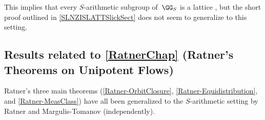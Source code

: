 % 
% 
% 

This implies that every $S$-arithmetic subgroup of~$\GG_S$ is a lattice \cite[Thm.~5.7, p.~268]{PlatonovRapinchukBook}, but the short proof outlined in \cref{SLNZISLATTSlickSect} does not seem to generalize to this setting.



\subsection*{Results related to \cref{RatnerChap} (Ratner's Theorems on Unipotent Flows)}
Ratner's three main theorems (\ref{Ratner-OrbitClosure}, \ref{Ratner-Equidistribution}, and \ref{Ratner-MeasClass})
have all been generalized to the $S$-arithmetic setting by Ratner \cite{Ratner-CartProd,Ratner-Sarith} and Margulis-Tomanov \cite{MargulisTomanov-LocField,MargulisTomanov-AlmLinear} (independently).





